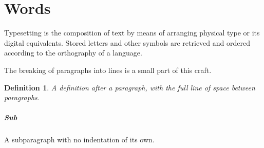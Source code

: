 \documentclass[fontsize=12pt,paper=letter,parskip=full]{scrartcl}
\newtheorem{definition}{Definition}
\begin{document}
\section{Words}
Typesetting is the composition of text by means of arranging physical type or its digital equivalents. Stored letters and other symbols are retrieved and ordered according to the orthography of a language.

The breaking of paragraphs into lines is a small part of this craft.
\begin{definition}
A definition after a paragraph, with the full line of space between paragraphs.
\end{definition}
\subparagraph{Sub} A subparagraph with no indentation of its own.
\end{document}
